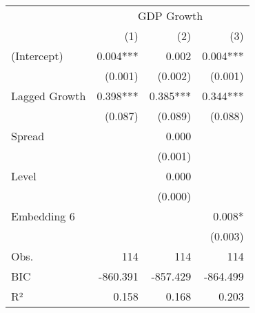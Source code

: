 \begin{tabular}{lrrr}
\toprule
              & \multicolumn{3}{c}{GDP Growth} \\ 
\cmidrule(lr){2-4} 
              &      (1) &      (2) &      (3) \\ 
\midrule
(Intercept)   & 0.004*** &    0.002 & 0.004*** \\ 
              &  (0.001) &  (0.002) &  (0.001) \\ 
Lagged Growth & 0.398*** & 0.385*** & 0.344*** \\ 
              &  (0.087) &  (0.089) &  (0.088) \\ 
Spread        &          &    0.000 &          \\ 
              &          &  (0.001) &          \\ 
Level         &          &    0.000 &          \\ 
              &          &  (0.000) &          \\ 
Embedding 6   &          &          &   0.008* \\ 
              &          &          &  (0.003) \\ 
\midrule
Obs.          &      114 &      114 &      114 \\ 
BIC           & -860.391 & -857.429 & -864.499 \\ 
R²            &    0.158 &    0.168 &    0.203 \\ 
\bottomrule
\end{tabular}
